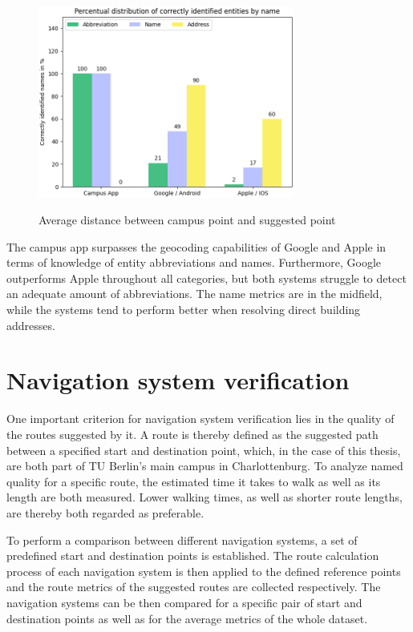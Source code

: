 \begin{figure}[H]
	\centering
	\includegraphics[width=0.75\textwidth]{images/results_geocoding_identifiers.png}\\
	\caption{Average distance between campus point and suggested point}
\end{figure}

The campus app surpasses the geocoding capabilities of Google and Apple in terms of knowledge of entity abbreviations and names. Furthermore, Google outperforms Apple throughout all categories, but both systems struggle to detect an adequate amount of abbreviations. The name metrics are in the midfield, while the systems tend to perform better when resolving direct building addresses.

\section{Navigation system verification}
One important criterion for navigation system verification lies in the quality of the routes suggested by it. A route is thereby defined as the suggested path between a specified start and destination point, which, in the case of this thesis, are both part of TU Berlin's main campus in Charlottenburg. To analyze named quality for a specific route, the estimated time it takes to walk as well as its length are both measured. Lower walking times, as well as shorter route lengths, are thereby both regarded as preferable.

To perform a comparison between different navigation systems, a set of predefined start and destination points is established. The route calculation process of each navigation system is then applied to the defined reference points and the route metrics of the suggested routes are collected respectively. The navigation systems can be then compared for a specific pair of start and destination points as well as for the average metrics of the whole dataset. 

